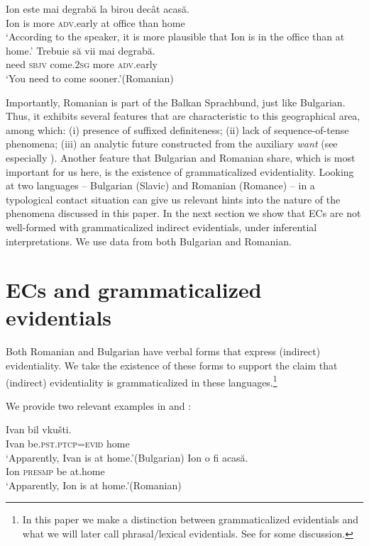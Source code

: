 \documentclass[output=paper,
]{langscibook}
\begin{document}
 	\ea
 	\ea\label{RomEC}\gll Ion este mai degrabă la birou decât acasă.\\
	Ion is more \textsc{adv}.early at office than home\\
	\glt `According to the speaker, it is more plausible that Ion is in the office than at home.'
	\ex\label{RomTempAdv}\gll Trebuie să vii mai degrabă.\\
	need \textsc{sbjv} come.\textsc{2sg} more  \textsc{adv}.early\\
	\glt `You need to come sooner.'\hfill (Romanian)
	\z\z 

\noindent Importantly, Romanian is part of the Balkan Sprachbund, just like Bulgarian. Thus, it exhibits several features that are characteristic to this geographical area, among which: (i) presence of suffixed definiteness; (ii) lack of sequence-of-tense phenomena; (iii) an analytic future constructed from the auxiliary \textit{want} (see especially \citealt{mistom06}). Another feature that Bulgarian and Romanian share, which is most important for us here, is the existence of grammaticalized evidentiality. Looking at two languages -- Bulgarian (Slavic) and Romanian (Romance) -- in a typological contact situation can give us relevant hints into the nature of the phenomena discussed in this paper. In the next section we show that ECs are not well-formed  with grammaticalized indirect evidentials, under inferential interpretations. We use data from both Bulgarian and Romanian.



\section{ECs and grammaticalized evidentials} \label{ECsIIEV}
Both Romanian and Bulgarian have verbal forms that express (indirect) evidentiality. We take the existence of these forms to support the claim that (indirect) evidentiality is grammaticalized in these languages.\footnote{In this paper we make a distinction between grammaticalized evidentials and what we will later call phrasal/lexical evidentials. See  for some discussion.} 

We provide two relevant examples in  and :

	\ea \ea \gll Ivan bil vkušti. \\
		Ivan be.\textsc{pst.ptcp=evid} home \\
		\glt `Apparently, Ivan is at home.'\hfill (Bulgarian) \label{bulevid}
    \ex \gll Ion o fi acasă. \\
 		Ion \textsc{presmp} be at.home \\
		\glt `Apparently, Ion is at home.'\hfill (Romanian) \label{romevid}
        \z \z 
\end{document}
